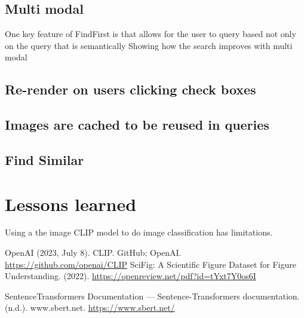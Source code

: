 \documentclass[article, 10pt]{article}
\begin{document}
\subsection{Multi modal}
One key feature of FindFirst is that allows for the user to query based not only on the 
query that is semantically 
Showing how the search improves with multi modal 
\subsection{Re-render on users clicking check boxes}
\subsection{Images are cached to be reused in queries}

\subsection{Find Similar}

\section{Lessons learned} 
Using a the image CLIP model to do image classification has limitations. 


\begin{thebibliography}{99}
 OpenAI (2023, July 8). CLIP. GitHub; OpenAI. \url{https://github.com/openai/CLIP}
 SciFig: A Scientific Figure Dataset for Figure Understanding. (2022). \url{https://openreview.net/pdf?id=tYxt7Y0os6I}

 SentenceTransformers Documentation — Sentence-Transformers documentation. (n.d.). www.sbert.net. \url{https://www.sbert.net/}


\end{thebibliography}
\end{document}

